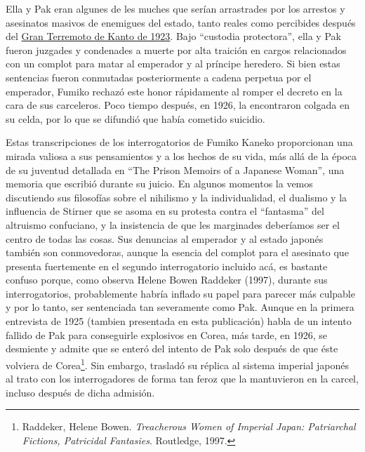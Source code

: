 \documentclass[
]{book}
\begin{document}
Ella y Pak eran algunes de les muches que serían arrastrades por los arrestos y asesinatos masivos de enemigues del estado, tanto reales como percibides después del \href{https://es.wikipedia.org/wiki/Gran_terremoto_de_Kant\%C5\%8D}{Gran Terremoto de Kanto de 1923}. Bajo ``custodia protectora'', ella y Pak fueron juzgades y condenades a muerte por alta traición en cargos relacionados con un complot para matar al emperador y al príncipe heredero. Si bien estas sentencias fueron conmutadas posteriormente a cadena perpetua por el emperador, Fumiko rechazó este honor rápidamente al romper el decreto en la cara de sus carceleros. Poco tiempo después, en 1926, la encontraron colgada en su celda, por lo que se difundió que había cometido suicidio.

Estas transcripciones de los interrogatorios de Fumiko Kaneko proporcionan una mirada valiosa a sus pensamientos y a los hechos de su vida, más allá de la época de su juventud detallada en ``The Prison Memoirs of a Japanese Woman'', una memoria que escribió durante su juicio. En algunos momentos la vemos discutiendo sus filosofías sobre el nihilismo y la individualidad, el dualismo y la influencia de Stirner que se asoma en su protesta contra el ``fantasma'' del altruismo confuciano, y la insistencia de que les marginades deberíamos ser el centro de todas las cosas. Sus denuncias al emperador y al estado japonés también son conmovedoras, aunque la esencia del complot para el asesinato que presenta fuertemente en el segundo interrogatorio incluido acá, es bastante confuso porque, como observa Helene Bowen Raddeker (1997), durante sus interrogatorios, probablemente habría inflado su papel para parecer más culpable y por lo tanto, ser sentenciada tan severamente como Pak. Aunque en la primera entrevista de 1925 (tambien presentada en esta publicación) habla de un intento fallido de Pak para conseguirle explosivos en Corea, más tarde, en 1926, se desmiente y admite que se enteró del intento de Pak solo después de que éste volviera de Corea\footnote{Raddeker, Helene Bowen. \emph{Treacherous Women of Imperial Japan: Patriarchal Fictions, Patricidal Fantasies}. Routledge, 1997.}. Sin embargo, trasladó su réplica al sistema imperial japonés al trato con los interrogadores de forma tan feroz que la mantuvieron en la carcel, incluso después de dicha admisión.
\end{document}
